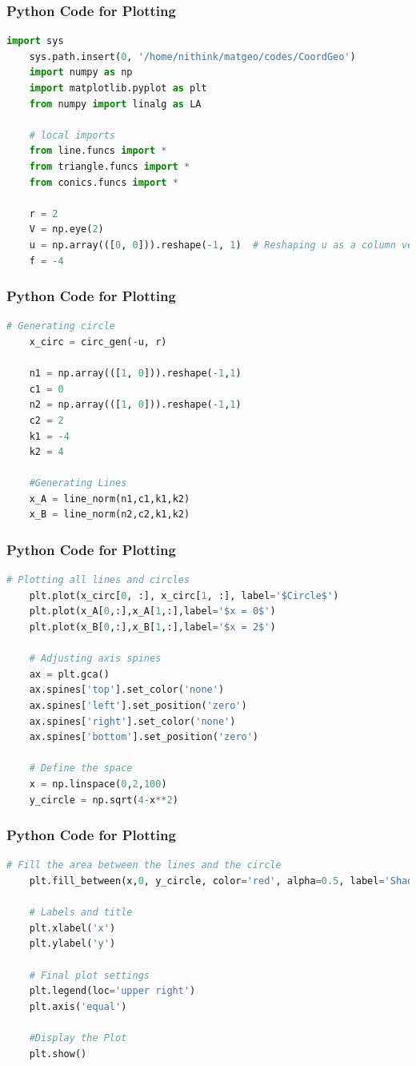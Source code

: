 \documentclass{beamer}
\theoremstyle{remark}
\numberwithin{equation}{section}
\begin{document}
\begin{frame}[fragile]
	\frametitle{Python Code for Plotting}
	\begin{lstlisting}[language=Python]
	import sys
	sys.path.insert(0, '/home/nithink/matgeo/codes/CoordGeo')
	import numpy as np
	import matplotlib.pyplot as plt
	from numpy import linalg as LA
	
	# local imports
	from line.funcs import *
	from triangle.funcs import *
	from conics.funcs import *

	r = 2
	V = np.eye(2)
	u = np.array(([0, 0])).reshape(-1, 1)  # Reshaping u as a column vector
	f = -4
	\end{lstlisting}
\end{frame}
\begin{frame}[fragile]
	\frametitle{Python Code for Plotting}
	\begin{lstlisting}[language=Python]
	# Generating circle
	x_circ = circ_gen(-u, r)
	
	n1 = np.array(([1, 0])).reshape(-1,1) 
	c1 = 0
	n2 = np.array(([1, 0])).reshape(-1,1)
	c2 = 2
	k1 = -4
	k2 = 4
	
	#Generating Lines
	x_A = line_norm(n1,c1,k1,k2)
	x_B = line_norm(n2,c2,k1,k2)
	\end{lstlisting}
\end{frame}
\begin{frame}[fragile]
	\frametitle{Python Code for Plotting}
	\begin{lstlisting}[language=Python]
	# Plotting all lines and circles
	plt.plot(x_circ[0, :], x_circ[1, :], label='$Circle$')
	plt.plot(x_A[0,:],x_A[1,:],label='$x = 0$')
	plt.plot(x_B[0,:],x_B[1,:],label='$x = 2$')

	# Adjusting axis spines
	ax = plt.gca()
	ax.spines['top'].set_color('none')
	ax.spines['left'].set_position('zero')
	ax.spines['right'].set_color('none')
	ax.spines['bottom'].set_position('zero')

	# Define the space
	x = np.linspace(0,2,100)
	y_circle = np.sqrt(4-x**2)
	\end{lstlisting}
\end{frame}
\begin{frame}[fragile]
	\frametitle{Python Code for Plotting}
        \begin{lstlisting}[language=Python]
	# Fill the area between the lines and the circle
	plt.fill_between(x,0, y_circle, color='red', alpha=0.5, label='Shaded Region')

	# Labels and title
	plt.xlabel('x')
	plt.ylabel('y')
	
	# Final plot settings
	plt.legend(loc='upper right')
	plt.axis('equal')
	
	#Display the Plot
	plt.show()
	\end{lstlisting}
\end{frame}
\end{document}
